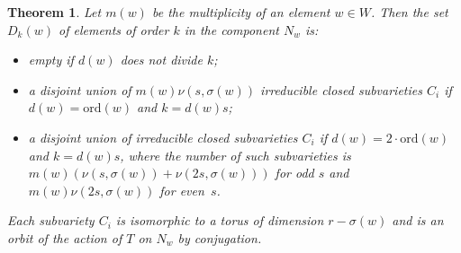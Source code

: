 \documentclass[10pt,a4paper]{amsart}
\newtheorem{theorem}{Theorem}
\newcommand{\ord}{\mathrm{ord}}
\begin{document}
\begin{theorem} \label{tmain}
Let $m(w)$ be the multiplicity of an element $w\in W$. Then the set $D_k(w)$ of elements of order $k$ in the component $N_w$ is:
\begin{itemize}
\item[a)]
empty if $d(w)$ does not divide $k$;
\item[b)]
a disjoint union of $m(w)\nu(s,\sigma(w))$ irreducible closed subvarieties $C_i$ if $d(w)=\ord(w)$ and $k=d(w)s$;
\item[c)]
a disjoint union of irreducible closed subvarieties $C_i$ if $d(w)=2\cdot\ord(w)$ and $k=d(w)s$, where the number of such subvarieties is
$m(w)(\nu(s,\sigma(w))+\nu(2s,\sigma(w)))$ for odd $s$ and $m(w)\nu(2s,\sigma(w))$ for even~$s$.
\end{itemize}
Each subvariety $C_i$ is isomorphic to a torus of dimension $r-\sigma(w)$ and is an orbit of the action of $T$ on $N_w$ by conjugation.
\end{theorem}
\end{document}
